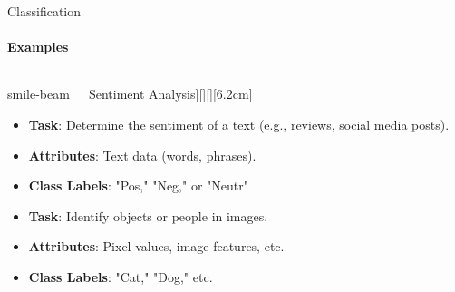 \documentclass[aspectratio=169]{beamer}
\begin{document}
\begin{frame}{Classification}
    \framesubtitle{Examples}

    \vspace{-1cm}
    \begin{columns}
        \begin{column}{0.32\textwidth}
        
            \begin{coloredblock}[yellow][\faIcon[regular]{smile-beam}~~~Sentiment Analysis][\footnotesize\centering][][6.2cm]
                \begin{itemize}
                    \item \scriptsize \textbf{Task}: Determine the sentiment of a text (e.g., reviews, social media posts).
                    \item \scriptsize \textbf{Attributes}: Text data (words, phrases).
                    \item \scriptsize \textbf{Class Labels}: "Pos," "Neg," or "Neutr"
                \end{itemize}
            \end{coloredblock}
            \vspace{0.1cm}
            \begin{coloredblock}
                    \begin{itemize}
                        \item \scriptsize \textbf{Task}: Identify objects or people in images.
                        \item \scriptsize \textbf{Attributes}: Pixel values, image features, etc.
                        \item \scriptsize \textbf{Class Labels}: "Cat," "Dog," etc.
                    \end{itemize}
            \end{coloredblock}
            

\end{column}
\end{columns}
\end{frame}
\end{document}
